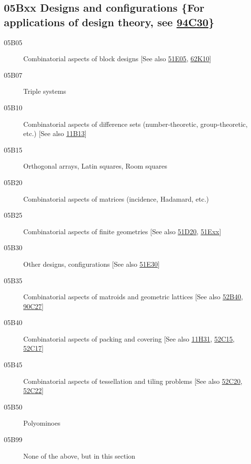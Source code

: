 \subsection*{05Bxx  Designs and configurations \{For applications of design theory, see \hyperref[94C30]{94C30}\} }\label{05Bxx}
\begin{description}  
\item [05B05]\label{05B05} Combinatorial aspects of block designs [See also \hyperref[51E05]{51E05}, \hyperref[62K10]{62K10}]
\item [05B07]\label{05B07} Triple systems
\item [05B10]\label{05B10} Combinatorial aspects of difference sets (number-theoretic, group-theoretic, etc.) [See also \hyperref[11B13]{11B13}]
\item [05B15]\label{05B15} Orthogonal arrays, Latin squares, Room squares
\item [05B20]\label{05B20} Combinatorial aspects of matrices (incidence, Hadamard, etc.)
\item [05B25]\label{05B25} Combinatorial aspects of finite geometries [See also \hyperref[51D20]{51D20}, \hyperref[51Exx]{51Exx}]
\item [05B30]\label{05B30} Other designs, configurations [See also \hyperref[51E30]{51E30}]
\item [05B35]\label{05B35} Combinatorial aspects of matroids and geometric lattices [See also \hyperref[52B40]{52B40}, \hyperref[90C27]{90C27}]
\item [05B40]\label{05B40} Combinatorial aspects of packing and covering [See also \hyperref[11H31]{11H31}, \hyperref[52C15]{52C15}, \hyperref[52C17]{52C17}]
\item [05B45]\label{05B45} Combinatorial aspects of tessellation and tiling problems [See also \hyperref[52C20]{52C20}, \hyperref[52C22]{52C22}]
\item [05B50]\label{05B50} Polyominoes
\item [05B99]\label{05B99} None of the above, but in this section
\end{description}

